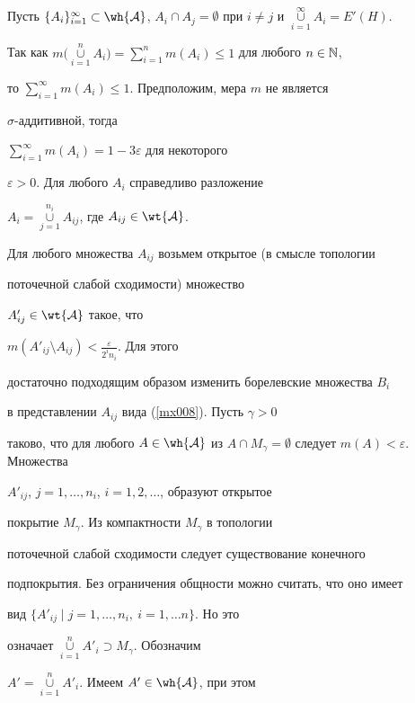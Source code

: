 \begin{pf}


Пусть $\{A_i\}_{i=1}^{\infty}\subset\wh{\cal{A}}$, $A_i\cap


A_j=\emptyset$ при $i\neq j$ и $\mathop{\cup}\limits_{i=1}^{\infty}A_i=E'(H)$.


Так как $m \big(\mathop{\cup}\limits_{i=1}^{n}A_i\big)=


\sum\limits_{i=1}^{n}m(A_i)\leq 1$ для любого $n\in\Bbb{N}$,


то $\sum\limits_{i=1}^{\infty}m(A_i)\leq 1$. Предположим, мера $m$ не является


$\sigma$-аддитивной, тогда


$\sum\limits_{i=1}^{\infty}m(A_i)=1-3\varepsilon$ для некоторого


$\varepsilon>0$. Для любого $A_i$ справедливо разложение


$A_i=\mathop{\cup}\limits_{j=1}^{n_i} A_{ij}$, где $A_{ij}\in\wt{\cal{A}}$.


Для любого множества $A_{ij}$ возьмем открытое (в смысле топологии


поточечной слабой сходимости) множество


$A'_{ij}\in\wt{\cal{A}}$ такое, что


$m(A'_{ij}\setminus A_{ij})<\frac{\varepsilon}{2^i n_i}$. Для этого


достаточно подходящим образом изменить борелевские множества $B_i$


в представлении $A_{ij}$ вида (\ref{mx008}). Пусть $\gamma>0$


таково, что для любого $A\in\wh{\cal{A}}$ из $A\cap


M_\gamma=\emptyset$ следует $m(A)<\varepsilon$. Множества


$A'_{ij}$, $j=1,\dotsc,n_i$, $i=1,2,\dotsc$, образуют открытое


покрытие $M_\gamma$. Из компактности $M_\gamma$ в топологии


поточечной слабой сходимости следует существование конечного


подпокрытия. Без ограничения общности можно считать, что оно имеет


вид $\{A'_{ij}\mid j=1,\dotsc,n_i,\ i=1,\dotsc n\}$. Но это


означает $\mathop{\cup}\limits_{i=1}^n A'_i\supset M_\gamma$. Обозначим


$A'=\mathop{\cup}\limits_{i=1}^n A'_i$. Имеем $A'\in\wh{\cal{A}}$, при этом


$$



\end{pf}
